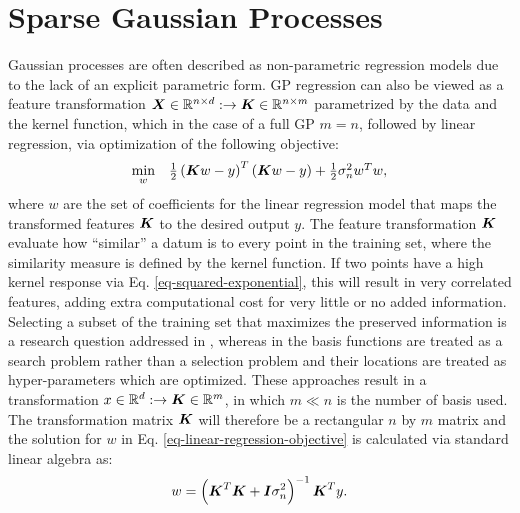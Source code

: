 \documentclass[useAMS,usenatbib,fleqn]{mn2e}
\begin{document}
\section{Sparse Gaussian Processes}
\label{sec-sparse-gaussian-processes}
Gaussian processes are often described as non-parametric regression models due to the lack of an explicit parametric form. GP regression can also be viewed as a feature transformation $\bmath{X}\in \mathbb{R}^{n\times d}:\rightarrow \bmath{K}\in \mathbb{R}^{n\times m}$ parametrized by the data and the kernel function, which in the case of a full GP $m=n$, followed by linear regression, via optimization of the following objective:
\begin{equation}
\label{eq-linear-regression-objective}
\begin{array}{lcl}
\underset{w}{\text{min}} &\frac{1}{2}\left ( \bmath{K}w-y \right )^{T}\left( \bmath{K}w-y \right )+\frac{1}{2}\sigma_{n}^{2}w^{T}w,
\end{array}
\end{equation}
where $w$ are the set of coefficients for the linear regression model that maps the transformed features $\bmath{K}$ to the desired output $y$. The feature transformation $\bmath{K}$ evaluate how ``similar'' a datum is to every point in the training set, where the similarity measure is defined by the kernel function. If two points have a high kernel response via  Eq. \eqref{eq-squared-exponential}, this will result in very correlated features, adding extra computational cost for very little or no added information. Selecting a subset of the training set that maximizes the preserved information is a research question addressed in \citep{foster2009}, whereas in \citep{snelson2005} the basis functions are treated as a search problem rather than a selection problem and their locations are treated as hyper-parameters which are optimized. These approaches result in a transformation $x\in \mathbb{R}^{d}:\rightarrow \bmath{K}\in \mathbb{R}^{m}$, in which $m\ll n$ is the number of basis used. The transformation matrix $\bmath{K}$ will therefore be a rectangular $n$ by $m$ matrix and the solution for $w$ in  Eq. \eqref{eq-linear-regression-objective} is calculated via standard linear algebra as:
\begin{equation}
\label{eq-linear-regression-objective-rectangular}
w = \left(\bmath{K}^{T}\bmath{K}+\bmath{I}\sigma_{n}^{2} \right)^{-1}\bmath{K}^{T}y.
\end{equation}
\end{document}
